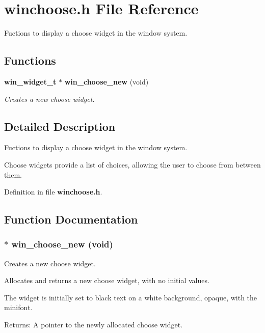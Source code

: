 \section{winchoose.h File Reference}
\label{winchoose_8h}
Fuctions to display a choose widget in the window system. 

\subsection*{Functions}
\begin{CompactItemize}
\item 
{\bf win\_\-widget\_\-t} $\ast$ {\bf win\_\-choose\_\-new} (void)
\begin{CompactList}\small\item\em Creates a new choose widget. \item\end{CompactList}\end{CompactItemize}


\subsection{Detailed Description}
Fuctions to display a choose widget in the window system. 

Choose widgets provide a list of choices, allowing the user to choose from between them. 

Definition in file {\bf winchoose.h}.

\subsection{Function Documentation}
\subsubsection{$\ast$ win\_\-choose\_\-new (void)}\label{winchoose_8h_a0}


Creates a new choose widget. 

Allocates and returns a new choose widget, with no initial values.

The widget is initially set to black text on a white background, opaque, with the minifont.

\begin{Desc}
\item[Returns:]A pointer to the newly allocated choose widget. \end{Desc}
